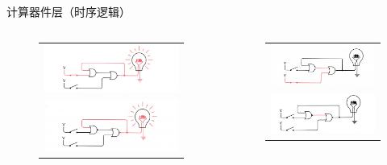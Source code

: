 \documentclass{myslide}
\begin{document}
\begin{frame}{计算器件层（时序逻辑）}
\begin{columns}
\begin{column}{0.5\linewidth}
\begin{figure}
\centering
\begin{tabular}{c}
\includegraphics[width=\linewidth]{fig/Lecture2/ff_1.jpg}\\
\includegraphics[width=\linewidth]{fig/Lecture2/ff_2.jpg}
\end{tabular}
\end{figure}
\end{column}
\pause
\begin{column}{0.5\linewidth}
\begin{figure}
\centering
\begin{tabular}{c}
\includegraphics[width=\linewidth]{fig/Lecture2/ff_3.jpg}\\
\includegraphics[width=\linewidth]{fig/Lecture2/ff_4.jpg}

\end{tabular}
\end{figure}
\end{column}
\end{columns}
\end{frame}
\end{document}
